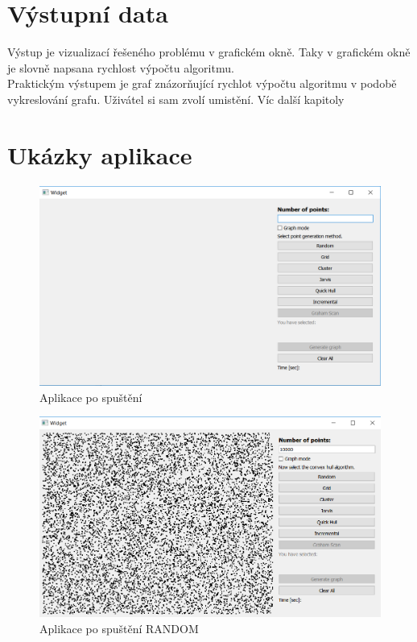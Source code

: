 \documentclass{article}
\begin{document}
\section{Výstupní data}
Výstup je vizualizací řešeného problému v grafickém okně. Taky v grafickém okně je slovně napsana rychlost výpočtu algoritmu.\\ 
\bigskip 
Praktickým výstupem je graf znázorňující rychlot výpočtu algoritmu v podobě vykreslování grafu. Uživátel si sam zvolí umistění. Víc další kapitoly\\ 
\bigskip 
\clearpage
\section{Ukázky aplikace} %
\bigskip
\begin{figure}[htbp]
\centering
        \includegraphics[clip, trim=0cm 0cm 0cm 0cm, width=1\textwidth]{obrazek1.png}
        \caption{Aplikace po spuštění}
\end{figure}
\begin{figure}[htbp]
\centering
        \includegraphics[clip, trim=0cm 0cm 0cm 0cm, width=1\textwidth]{obrazek2.png}
        \caption{Aplikace po spuštění RANDOM}
\end{figure}
\end{document}
